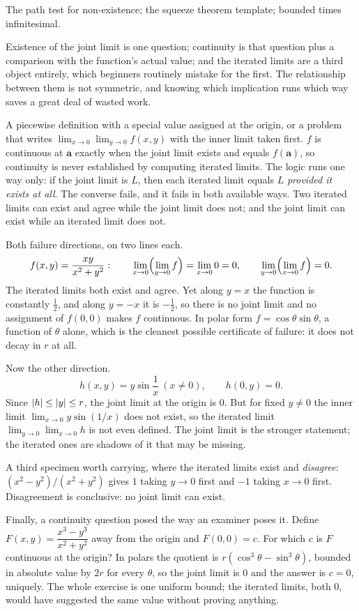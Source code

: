 \begin{seealsob}The path test for non-existence; the squeeze theorem template; bounded times infinitesimal.\end{seealsob}

Existence of the joint limit is one question; continuity is that question plus a comparison with the function's actual value; and the iterated limits are a third object entirely, which beginners routinely mistake for the first. The relationship between them is not symmetric, and knowing which implication runs which way saves a great deal of wasted work.

\cue A piecewise definition with a special value assigned at the origin, or a problem that writes $\lim_{x\to0}\lim_{y\to0}f(x,y)$ with the inner limit taken first.
\method $f$ is continuous at $\mathbf a$ exactly when the joint limit exists and equals $f(\mathbf a)$, so continuity is never established by computing iterated limits. The logic runs one way only: if the joint limit is $L$, then each iterated limit equals $L$ \emph{provided it exists at all}. The converse fails, and it fails in both available ways. Two iterated limits can exist and agree while the joint limit does not; and the joint limit can exist while an iterated limit does not.

\begin{worked}
Both failure directions, on two lines each.
\[f(x,y)=\frac{xy}{x^{2}+y^{2}}:\qquad \lim_{x\to0}\Bigl(\lim_{y\to0}f\Bigr)=\lim_{x\to0}0=0,\qquad \lim_{y\to0}\Bigl(\lim_{x\to0}f\Bigr)=0 .\]
The iterated limits both exist and agree. Yet along $y=x$ the function is constantly $\tfrac12$, and along $y=-x$ it is $-\tfrac12$, so there is no joint limit and no assignment of $f(0,0)$ makes $f$ continuous. In polar form $f=\cos\theta\sin\theta$, a function of $\theta$ alone, which is the cleanest possible certificate of failure: it does not decay in $r$ at all.

Now the other direction.
\[h(x,y)=y\sin\frac1x\ (x\neq0),\qquad h(0,y)=0 .\]
Since $\left\lvert h\right\rvert\leq\left\lvert y\right\rvert\leq r$, the joint limit at the origin is $0$. But for fixed $y\neq0$ the inner limit $\lim_{x\to0}y\sin(1/x)$ does not exist, so the iterated limit $\lim_{y\to0}\lim_{x\to0}h$ is not even defined. The joint limit is the stronger statement; the iterated ones are shadows of it that may be missing.

A third specimen worth carrying, where the iterated limits exist and \emph{disagree}: $(x^{2}-y^{2})/(x^{2}+y^{2})$ gives $1$ taking $y\to0$ first and $-1$ taking $x\to0$ first. Disagreement is conclusive: no joint limit can exist.

Finally, a continuity question posed the way an examiner poses it. Define $F(x,y)=\dfrac{x^{3}-y^{3}}{x^{2}+y^{2}}$ away from the origin and $F(0,0)=c$. For which $c$ is $F$ continuous at the origin? In polars the quotient is $r(\cos^{3}\theta-\sin^{3}\theta)$, bounded in absolute value by $2r$ for every $\theta$, so the joint limit is $0$ and the answer is $c=0$, uniquely. The whole exercise is one uniform bound; the iterated limits, both $0$, would have suggested the same value without proving anything.
\end{worked}

